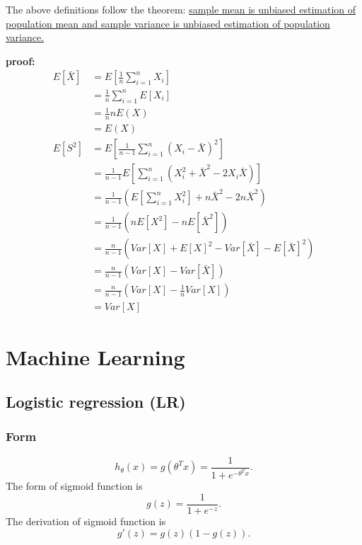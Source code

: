 \documentclass[10pt,onecolumn]{book}
\begin{document}
The above definitions follow the theorem: \uline{sample mean is unbiased estimation of population mean and sample variance is unbiased estimation of population variance.}　

\textbf{proof:}
\begin{equation}\label{eq:unbiased_estimation_of_sample_mean_and_variance}
\begin{split}
E[\bar{X}] &= E[\frac{1}{n} \sum_{i=1}^n X_i] \\
			&= \frac{1}{n} \sum_{i=1}^n E[X_i] \\
			&= \frac{1}{n} n E(X) \\
			&= E(X) \\
E[S^2] &= E[\frac{1}{n - 1} \sum_{i=1}^n(X_i - \bar{X})^2] \\
		&= \frac{1}{n-1}E[\sum_{i=1}^n(X_i ^ 2 + \bar{X} ^ 2 - 2 X_i \bar{X})] \\
		&= \frac{1}{n-1}(E[\sum_{i=1}^nX_i ^ 2] + n\bar{X}^2 - 2n\bar{X}^2) \\
		&= \frac{1}{n-1}(nE[X ^ 2] - nE[\bar{X}^2]) \\
		&= \frac{n}{n-1}(Var[X] + E[X]^2 - Var[\bar{X}] - E[\bar{X}]^2) \\
		&= \frac{n}{n-1}(Var[X] - Var[\bar{X}]) \\
		&= \frac{n}{n-1}(Var[X] - \frac{1}{n}Var[X]) \\
		&= Var[X]
\end{split}
\end{equation}

\chapter{Machine Learning}
\section{Logistic regression (LR)}
\subsection{Form}
\begin{equation}
h_\theta(x) = g(\theta^T x)= \frac{1}{1 + e^{-\theta^T x}}.
\end{equation}
The form of sigmoid function is 
\begin{equation}
g(z) = \frac{1}{1 + e^{-z}}.
\end{equation}
The derivation of sigmoid function is 
\begin{equation}
g'(z) = g(z)(1-g(z)).
\end{equation}
\end{document}

